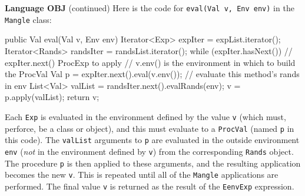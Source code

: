 \begin{minipage}[t]{\sw}
\slidenumber
\LARGE
{\bf Language OBJ} (continued)\exx
\LARGE
Here is the code for \verb'eval(Val v, Env env)' in the \verb'Mangle' class:
\Large
\begin{qv}
public Val eval(Val v, Env env) {
    Iterator<Exp> expIter = expList.iterator();
    Iterator<Rands> randsIter = randsList.iterator();
    while (expIter.hasNext()) {
        // expIter.next() ProcExp to apply
        // v.env() is the environment in which to build the ProcVal
        Val p = expIter.next().eval(v.env());
        // evaluate this method's rands in env
        List<Val> valList = randsIter.next().evalRands(env);
        v = p.apply(valList);
    }
    return v;
}
\end{qv}
\LARGE
Each \verb'Exp' is evaluated in the environment defined
by the value \verb'v' (which must, perforce, be a class or object),
and this must evaluate to a \verb'ProcVal' (named \verb'p' in this code).
The \verb'valList' arguments to \verb'p' are 
evaluated in the outside environment \verb'env'
({\em not} in the environment defined by \verb'v')
from the corresponding \verb'Rands' object.
The procedure \verb'p' is then applied to these arguments,
and the resulting application becomes the new \verb'v'.
This is repeated until all of the \verb'Mangle' applications are performed.
The final value \verb'v' is returned
as the result of the \verb'EenvExp' expression.
\end{minipage}
